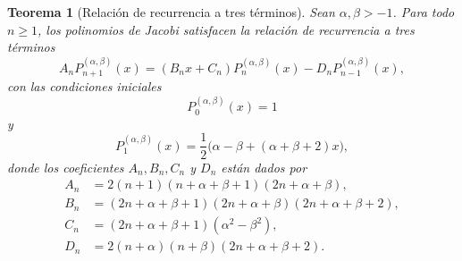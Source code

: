 \documentclass[12pt,a4paper]{book}
\newtheorem{theorem}{Teorema}
\begin{document}
\begin{theorem}[Relación de recurrencia a tres términos]
\label{teo:recurrencia_jacobi}
Sean $\alpha, \beta > -1$. Para todo $n \ge 1$, los polinomios de Jacobi satisfacen la relación de recurrencia a tres términos
\begin{equation*}
    A_n P_{n+1}^{(\alpha, \beta)}(x) = (B_n x + C_n) P_n^{(\alpha, \beta)}(x) - D_n P_{n-1}^{(\alpha, \beta)}(x),
\end{equation*}
con las condiciones iniciales
\[
P_0^{(\alpha, \beta)}(x) = 1
\]
y
\[
P_1^{(\alpha, \beta)}(x) = \frac{1}{2} \big( \alpha - \beta + (\alpha + \beta + 2)x \big),
\]
donde los coeficientes $A_n, B_n, C_n$ y $D_n$ están dados por
\begin{equation}
\label{eq:recurrencia_tres_terminos}
    \begin{aligned}
    A_n &= 2(n+1)(n+\alpha+\beta+1)(2n+\alpha+\beta), \\
    B_n &= (2n+\alpha+\beta+1)(2n+\alpha+\beta)(2n+\alpha+\beta+2), \\
    C_n &= (2n+\alpha+\beta+1)(\alpha^2 - \beta^2), \\
    D_n &= 2(n+\alpha)(n+\beta)(2n+\alpha+\beta+2).
    \end{aligned}
\end{equation}
\end{theorem}
\end{document}
